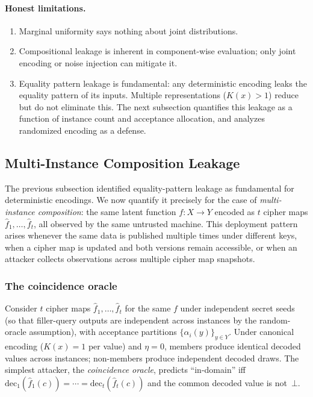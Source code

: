 \documentclass[11pt]{article}
\theoremstyle{definition}
\theoremstyle{plain}
\theoremstyle{remark}
\newcommand{\fhat}{\hat{f}}
\newcommand{\dec}{\mathrm{dec}}
\begin{document}
\paragraph{Honest limitations.}
\begin{enumerate}
\item Marginal uniformity says nothing about joint distributions.
\item Compositional leakage is inherent in component-wise evaluation;
    only joint encoding or noise injection can mitigate it.
\item Equality pattern leakage is fundamental: any deterministic encoding
    leaks the equality pattern of its inputs.  Multiple representations
    ($K(x) > 1$) reduce but do not eliminate this.  The next subsection
    quantifies this leakage as a function of instance count and
    acceptance allocation, and analyzes randomized encoding as a
    defense.
\end{enumerate}


\subsection{Multi-Instance Composition Leakage}
\label{subsec:multi-instance}

The previous subsection identified equality-pattern leakage as
fundamental for deterministic encodings.  We now quantify it precisely
for the case of \emph{multi-instance composition}: the same latent
function $f : X \to Y$ encoded as $t$ cipher maps
$\fhat_1, \ldots, \fhat_t$, all observed by the same untrusted machine.
This deployment pattern arises whenever the same data is published
multiple times under different keys, when a cipher map is updated and
both versions remain accessible, or when an attacker collects
observations across multiple cipher map snapshots.

\subsubsection*{The coincidence oracle}

Consider $t$ cipher maps $\fhat_1, \ldots, \fhat_t$ for the same $f$
under independent secret seeds (so that filler-query outputs are
independent across instances by the random-oracle assumption), with
acceptance partitions $\{\alpha_i(y)\}_{y \in Y}$.  Under canonical
encoding ($K(x) = 1$ per value) and $\eta = 0$, members produce
identical decoded values across instances; non-members produce
independent decoded draws.  The simplest attacker, the
\emph{coincidence oracle}, predicts ``in-domain'' iff
$\dec_1(\fhat_1(c)) = \cdots = \dec_t(\fhat_t(c))$ and the common
decoded value is not~$\bot$.
\end{document}
